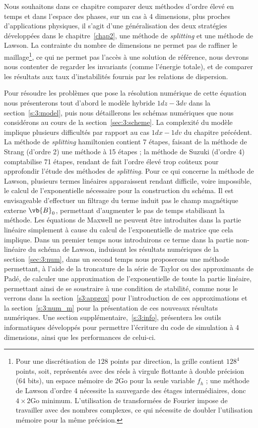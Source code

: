 Nous souhaitons dans ce chapitre comparer deux méthodes d'ordre élevé en temps et dans l'espace des phases, sur un cas à 4 dimensions, plus proches d'applications physiques, il s'agit d'une généralisation des deux stratégies développées dans le chapitre~\ref{chap2}, une méthode de \emph{splitting} et une méthode de Lawson. La contrainte du nombre de dimensions ne permet pas de raffiner le maillage\footnote{Pour une discrétisation de $128$ points par direction, la grille contient $128^4$ points, soit, représentés avec des réels à virgule flottante à double précision (64 bits), un espace mémoire de 2Go pour la seule variable $f_h$ ; une méthode de Lawson d'ordre 4 nécessite la sauvegarde des étages intermédiaires, donc $4\times 2\textrm{Go}$ minimum. L'utilisation de transformées de Fourier impose de travailler avec des nombres complexes, ce qui nécessite de doubler l'utilisation mémoire pour la même précision.}, ce qui ne permet pas l'accès à une solution de référence, nous devrons nous contenter de regarder les invariants (comme l'énergie totale), et de comparer les résultats aux taux d'instabilités fournis par les relations de dispersion.

Pour résoudre les problèmes que pose la résolution numérique de cette équation nous présenterons tout d'abord le modèle hybride $1dz-3dv$ dans la section~\ref{s:3:model}, puis nous détaillerons les schémas numériques que nous considérons au cours de la section~\ref{sec:3:scheme}. La complexité du modèle implique plusieurs difficultés par rapport au cas $1dx-1dv$ du chapitre précédent. La méthode de \emph{splitting} hamiltonien contient 7 étapes, faisant de la méthode de Strang (d'ordre 2) une méthode à 15 étapes ; la méthode de Suzuki (d'ordre 4) comptabilise 71 étapes, rendant de fait l'ordre élevé trop coûteux pour approfondir l'étude des méthodes de \emph{splitting}. Pour ce qui concerne la méthode de Lawson, plusieurs termes linéaires apparaissent rendant difficile, voire impossible, le calcul de l'exponentielle nécessaire pour la construction du schéma. Il est envisageable d'effectuer un filtrage du terme induit pas le champ magnétique externe $\vb{B}_0$, permettant d'augmenter le pas de temps stabilisant la méthode. Les équations de Maxwell ne peuvent être introduites dans la partie linéaire simplement à cause du calcul de l'exponentielle de matrice que cela implique. Dans un premier temps nous introduirons ce terme dans la partie non-linéaire du schéma de Lawson, induisant les résultats numériques de la section~\ref{sec:3:num}, dans un second temps nous proposerons une méthode permettant, à l'aide de la troncature de la série de Taylor ou des approximants de Padé, de calculer une approximation de l'exponentielle de toute la partie linéaire, permettant ainsi de se soustraire à une condition de stabilité, comme nous le verrons dans la section~\ref{s3:approx} pour l'introduction de ces approximations et la section~\ref{s:3:num_m} pour la présentation de ces nouveaux résultats numériques. Une section supplémentaire,~\ref{s:3:info}, présentera les outils informatiques développés pour permettre l'écriture du code de simulation à 4 dimensions, ainsi que les performances de celui-ci.